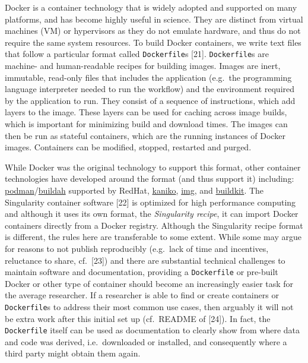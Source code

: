\documentclass[10pt,letterpaper]{article}
\begin{document}
Docker is a container technology that is widely adopted and supported on
many platforms, and has become highly useful in science. They are
distinct from virtual machines (VM) or hypervisors as they do not
emulate hardware, and thus do not require the same system resources. To
build Docker containers, we write text files that follow a particular
format called \texttt{Dockerfile}s {[}21{]}. \texttt{Dockerfile}s are
machine- and human-readable recipes for building images. Images are
inert, immutable, read-only files that includes the application
(e.g.~the programming language interpreter needed to run the workflow)
and the environment required by the application to run. They consist of
a sequence of instructions, which add layers to the image. These layers
can be used for caching across image builds, which is important for
minimizing build and download times. The images can then be run as
stateful containers, which are the running instances of Docker images.
Containers can be modified, stopped, restarted and purged.

While Docker was the original technology to support this format, other
container technologies have developed around the format (and thus
support it) including:
\href{https://podman.io/}{podman}/\href{https://github.com/containers/buildah}{buildah}
supported by RedHat,
\href{https://github.com/GoogleContainerTools/kaniko}{kaniko},
\href{https://github.com/genuinetools/img}{img}, and
\href{https://github.com/moby/buildkit}{buildkit}. The Singularity
container software {[}22{]} is optimized for high performance computing
and although it uses its own format, the \emph{Singularity recipe}, it
can import Docker containers directly from a Docker registry. Although
the Singularity recipe format is different, the rules here are
transferable to some extent. While some may argue for reasons to not
publish reproducibly (e.g.~lack of time and incentives, reluctance to
share, cf.~{[}23{]}) and there are substantial technical challenges to
maintain software and documentation, providing a \texttt{Dockerfile} or
pre-built Docker or other type of container should become an
increasingly easier task for the average researcher. If a researcher is
able to find or create containers or \texttt{Dockerfile}s to address
their most common use cases, then arguably it will not be extra work
after this initial set up (cf.~README of {[}24{]}). In fact, the
\texttt{Dockerfile} itself can be used as documentation to clearly show
from where data and code was derived, i.e.~downloaded or installed, and
consequently where a third party might obtain them again.
\end{document}
